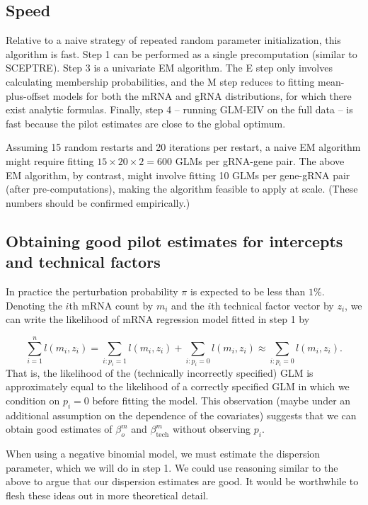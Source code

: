 \documentclass[12pt]{article}
\begin{document}
\subsection{Speed}

Relative to a naive strategy of repeated random parameter initialization, this algorithm is fast. Step 1 can be performed as a single precomputation (similar to SCEPTRE). Step 3 is a univariate EM algorithm. The E step only involves calculating membership probabilities, and the M step reduces to fitting mean-plus-offset models for both the mRNA and gRNA distributions, for which there exist analytic formulas. Finally, step 4 -- running GLM-EIV on the full data -- is fast because the pilot estimates are close to the global optimum.

Assuming 15 random restarts and 20 iterations per restart, a naive EM algorithm might require fitting $15 \times 20 \times 2 = 600$ GLMs per gRNA-gene pair. The above EM algorithm, by contrast, might involve fitting 10 GLMs per gene-gRNA pair (after pre-computations), making the algorithm feasible to apply at scale. (These numbers should be confirmed empirically.)

\subsection{Obtaining good pilot estimates for intercepts and technical factors}
 
 In practice the perturbation probability $\pi$ is expected to be less than $1\%$. Denoting the $i$th mRNA count by $m_i$ and the $i$th technical factor vector by $z_i$, we can write the likelihood of mRNA regression model fitted in step 1 by
 
 $$ \sum_{i=1}^n l(m_i, z_i) = \sum_{i : p_i = 1} l(m_i, z_i) + \sum_{i: p_i = 0} l(m_i, z_i) \approx \sum_{i : p_i = 0} l(m_i, z_i). $$ That is, the likelihood of the (technically incorrectly specified) GLM is approximately equal to the likelihood of a correctly specified GLM in which we condition on $p_i = 0$ before fitting the model. This observation (maybe under an additional assumption on the dependence of the covariates) suggests that we can obtain good estimates of $\beta^m_o$ and $\beta^m_\textrm{tech}$ without observing $p_i$.
 
When using a negative binomial model, we must estimate the dispersion parameter, which we will do in step 1. We could use reasoning similar to the above to argue that our dispersion estimates are good. It would be worthwhile to flesh these ideas out in more theoretical detail.


% 
% 
\end{document}
